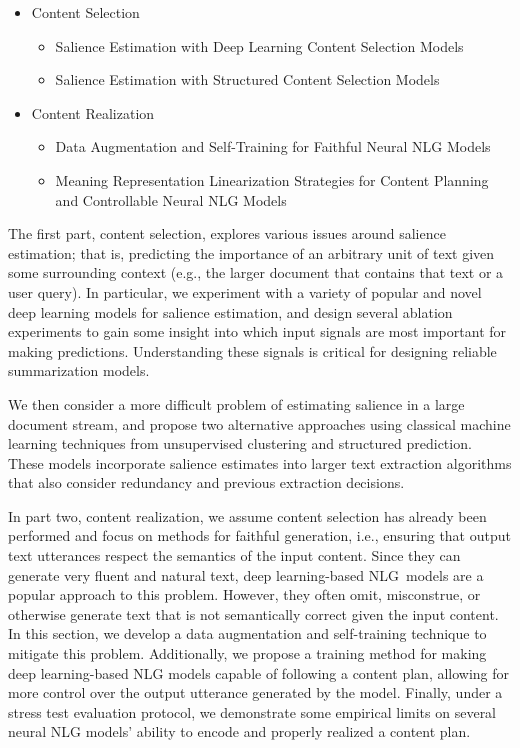 \begin{itemize}
  \item Content Selection
  \begin{itemize}
    \item Salience Estimation with Deep Learning Content Selection Models
    \item Salience Estimation with Structured Content Selection Models
  \end{itemize}
  \item Content Realization
  \begin{itemize}
    \item Data Augmentation and Self-Training for Faithful Neural NLG Models
    \item Meaning Representation Linearization Strategies for Content Planning
          and Controllable Neural NLG Models
  \end{itemize}
\end{itemize}

The first part, content selection, explores various issues around salience
estimation; that is, predicting the importance of an arbitrary unit of text
given some surrounding context (e.g., the larger document that contains that
text or a user query). In particular, we experiment with a variety of popular
and novel deep learning models for salience estimation, and design several
ablation experiments to gain some insight into which input signals are most
important for making predictions. Understanding these signals is critical for
designing reliable summarization models. 

We then consider a more difficult problem of estimating salience in a large
document stream, and propose two alternative approaches using classical machine
learning techniques from unsupervised clustering and structured prediction.
These models incorporate salience estimates into larger text extraction
algorithms that also consider redundancy and previous extraction decisions.
    
In part two, content realization, we assume content selection has already been
performed and focus on methods for faithful generation, i.e., ensuring that
output text utterances respect the semantics of the input content. Since they
can generate very fluent and natural text, deep learning-based NLG~models are a
popular approach to this problem. However, they often omit, misconstrue, or
otherwise generate text that is not semantically correct given the input
content. In this section, we develop a data augmentation and self-training
technique to mitigate this problem. Additionally, we propose a training method
for making deep learning-based NLG models capable of following a content plan,
allowing for more control over the output utterance generated by the model.
Finally, under a stress test evaluation protocol, we demonstrate some empirical
limits on several neural NLG models' ability to encode and properly realized a
content plan.
 

